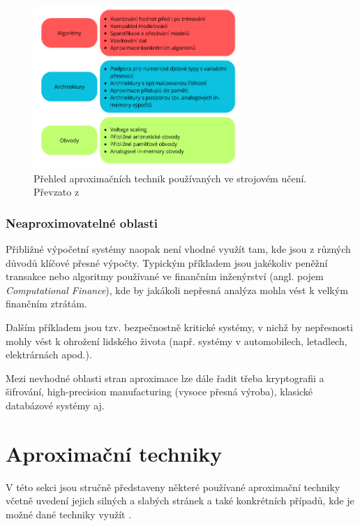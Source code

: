 \begin{figure}[H]
    \centering
    \includegraphics[width=0.7\textwidth]{obrazky-figures/ml.png}
    \caption{Přehled aproximačních technik používaných ve strojovém učení. Převzato z \cite{approx_ai}}
    \label{fig:enter-label}
\end{figure}

\subsubsection{Neaproximovatelné oblasti}
Přibližné výpočetní systémy naopak není vhodné využít tam, kde jsou z různých důvodů klíčové přesné výpočty. Typickým příkladem jsou jakékoliv peněžní transakce nebo algoritmy používané ve finančním inženýrství (angl. pojem \textit{Computational Finance}), kde by jakákoli nepřesná analýza mohla vést k velkým finančním ztrátám.

Dalším příkladem jsou tzv. bezpečnostně kritické systémy, v nichž by nepřesnosti mohly vést k ohrožení lidského života (např. systémy v automobilech, letadlech, elektrárnách apod.).

Mezi nevhodné oblasti stran aproximace lze dále řadit třeba kryptografii a šifrování, high-precision manufacturing (vysoce přesná výroba), klasické databázové systémy aj.

\section{Aproximační techniky}
V této sekci jsou stručně představeny některé používané aproximační techniky včetně uvedení jejich silných a slabých stránek a také konkrétních případů, kde je možné dané techniky využít \cite{ac_techniques}.

